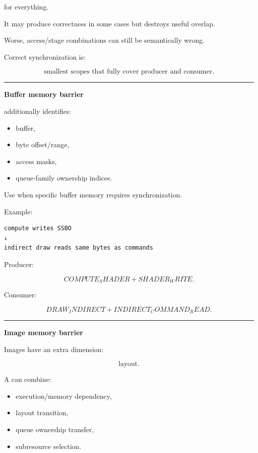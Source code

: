 for everything.

It may produce correctness in some cases but destroys useful overlap.

Worse, access/stage combinations can still be semantically wrong.

Correct synchronization is:

\[
\boxed{
\text{smallest scopes that fully cover producer and consumer}.
}
\]

\begin{center}\rule{0.5\linewidth}{0.5pt}\end{center}

\textbf{Buffer memory barrier}

 additionally identifies:

\begin{itemize}
\tightlist
\item
  buffer,
\item
  byte offset/range,
\item
  access masks,
\item
  queue-family ownership indices.
\end{itemize}

Use when specific buffer memory requires synchronization.

Example:

\begin{verbatim}
compute writes SSBO
↓
indirect draw reads same bytes as commands
\end{verbatim}

Producer:

\[
COMPUTE_SHADER
+
SHADER_WRITE.
\]

Consumer:

\[
DRAW_INDIRECT
+
INDIRECT_COMMAND_READ.
\]

\begin{center}\rule{0.5\linewidth}{0.5pt}\end{center}

\textbf{Image memory barrier}

Images have an extra dimension:

\[
\boxed{\text{layout}.}
\]

A  can combine:

\begin{itemize}
\tightlist
\item
  execution/memory dependency,
\item
  layout transition,
\item
  queue ownership transfer,
\item
  subresource selection.
\end{itemize}

